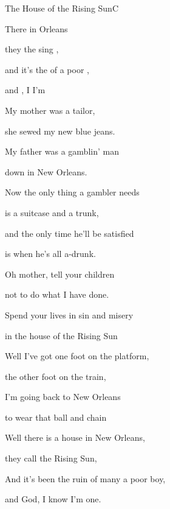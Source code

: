 \setcounter{page}{128}
\begin{song}{The House of the Rising Sun}{C}{}


\begin{SBVerse}

There  in  Orleans

they  the sing ,

and it's  the  of  a poor ,

and , I  I'm 

\end{SBVerse}

\begin{SBVerse}

My mother was a tailor,

she sewed my new blue jeans.

My father was a gamblin' man

down in New Orleans.

\end{SBVerse}

\begin{SBVerse}

Now the only thing a gambler needs

is a suitcase and a trunk,

and the only time he'll be satisfied

is when he's all a-drunk.

\end{SBVerse}

\begin{SBVerse}

Oh mother, tell your children

not to do what I have done.

Spend your lives in sin and misery

in the house of the Rising Sun

\end{SBVerse}

\begin{SBVerse}

Well I've got one foot on the platform,

the other foot on the train,

I'm going back to New Orleans

to wear that ball and chain

\end{SBVerse}

\begin{SBVerse}

Well there is a house in New Orleans,

they call the Rising Sun,

And it's been the ruin of many a poor boy,

and God, I know I'm one.

\end{SBVerse}

\end{song}

\clearpage
